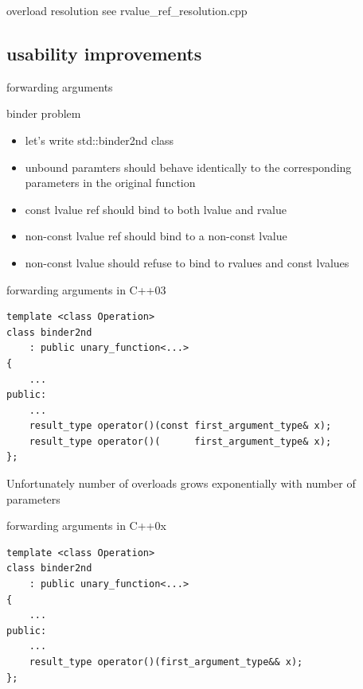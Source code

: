\documentclass{beamer}
\begin{document}
\begin{frame}{overload resolution}
  see rvalue\_ref\_resolution.cpp
\end{frame}

\subsection{usability improvements}
\begin{frame}{forwarding arguments}
  \begin{block}{binder problem}
    \begin{itemize}
    \item let's write std::binder2nd class
    \item unbound paramters should behave identically to the corresponding parameters in the original function
    \item const lvalue ref should bind to both lvalue and rvalue
    \item non-const lvalue ref should bind to a non-const lvalue
    \item non-const lvalue should refuse to bind to rvalues and const lvalues
    \end{itemize}
  \end{block}
\end{frame}

\begin{frame}{forwarding arguments in C++03}
\begin{verbatim}
template <class Operation>
class binder2nd
    : public unary_function<...>
{
    ...
public:
    ...
    result_type operator()(const first_argument_type& x);
    result_type operator()(      first_argument_type& x);
};
\end{verbatim}
\begin{block}{}
  Unfortunately number of overloads grows exponentially with number of
  parameters
\end{block}
\end{frame}

\begin{frame}{forwarding arguments in C++0x}
\begin{verbatim}
template <class Operation>
class binder2nd
    : public unary_function<...>
{
    ...
public:
    ...
    result_type operator()(first_argument_type&& x);
};
\end{verbatim}
\end{frame}
\end{document}

